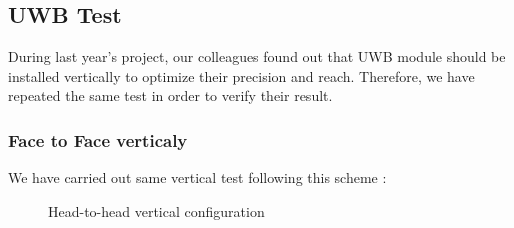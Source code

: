 \subsection{UWB Test}
 During last year's project, our colleagues found out that UWB module should be installed vertically to optimize their precision and reach. Therefore, we have repeated the same test in order to verify their result. 
\subsubsection{Face to Face verticaly}
\label{FtFV}
We have carried out same vertical test following this scheme :
\begin{figure}[H]
  \centering
  \FtFVertical
  \caption{Head-to-head vertical configuration}
\end{figure}

